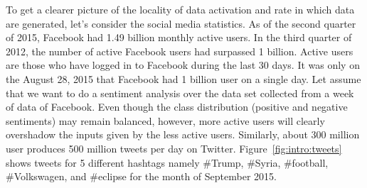 To get a clearer picture of the locality of data activation and rate in which data are generated, let's consider the social media statistics. As of the second quarter of 2015, Facebook had 1.49 billion monthly active users. In the third quarter of 2012, the number of active Facebook users had surpassed 1 billion. Active users are those who have logged in to Facebook during the last 30 days. It was only on the August 28, 2015 that Facebook had 1 billion user on a single day. Let assume that we want to do a sentiment analysis over the data set collected from a week of data of Facebook. Even though the class distribution (positive and negative sentiments)  may remain balanced, however, more active users will clearly overshadow the inputs given by the less active users. Similarly, about 300 million user produces 500 million tweets per day on Twitter. Figure~\ref{fig:intro:tweets} shows tweets for 5 different hashtags namely \#Trump, \#Syria, \#football, \#Volkswagen, and \#eclipse for the month of September 2015. 
